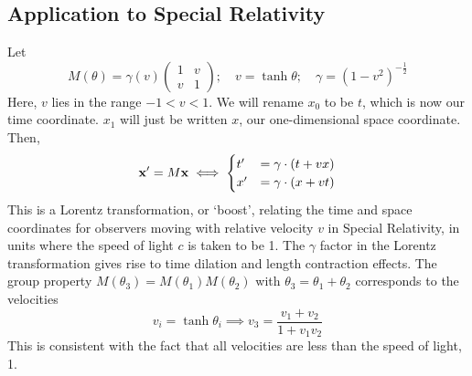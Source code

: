 \documentclass{article}
\begin{document}
\subsection{Application to Special Relativity}
Let
\[ M(\theta) = \gamma(v) \begin{pmatrix}
		1 & v \\ v & 1
	\end{pmatrix};\quad v = \tanh \theta;\quad \gamma = (1 - v^2)^{-\frac{1}{2}} \]
Here, $v$ lies in the range $-1 < v < 1$. We will rename $x_0$ to be $t$, which is now our time coordinate. $x_1$ will just be written $x$, our one-dimensional space coordinate. Then,
\[ \vb x' = M\vb x \iff \begin{cases}
		t' & = \gamma \cdot (t + vx) \\
		x' & = \gamma \cdot (x + vt)
	\end{cases} \]
This is a Lorentz transformation, or `boost', relating the time and space coordinates for observers moving with relative velocity $v$ in Special Relativity, in units where the speed of light $c$ is taken to be 1. The $\gamma$ factor in the Lorentz transformation gives rise to time dilation and length contraction effects. The group property $M(\theta_3) = M(\theta_1)M(\theta_2)$ with $\theta_3 = \theta_1 + \theta_2$ corresponds to the velocities
\[ v_i = \tanh \theta_i \implies v_3 = \frac{v_1 + v_2}{1 + v_1 v_2} \]
This is consistent with the fact that all velocities are less than the speed of light, 1.
\end{document}
